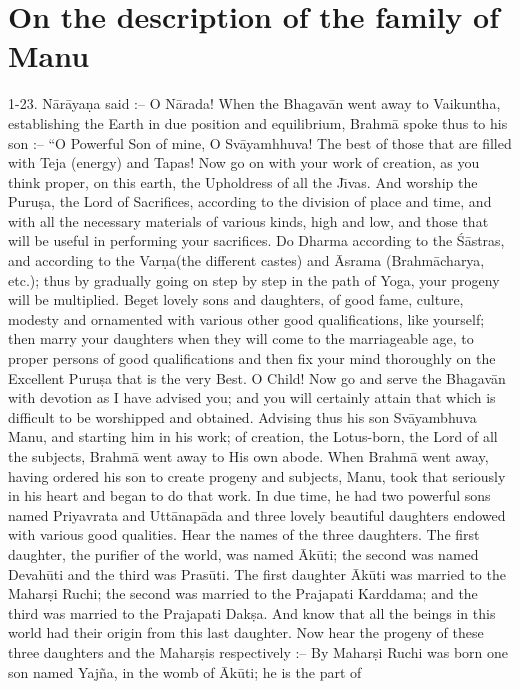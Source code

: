 \chapter{On the description of the family of Manu}

1-23. N\=ar\=aya\d{n}a said :-- O N\=arada! When the Bhagav\=an went away to Vaikuntha, establishing the Earth in due position and equilibrium, Brahm\=a spoke thus to his son :-- ``O Powerful Son of mine, O Sv\=ayamhhuva! The best of those that are filled with Teja (energy) and Tapas! Now go on with your work of creation, as you think proper, on this earth, the Upholdress of all the J\={\i}vas. And worship the Puru\d{s}a, the Lord of Sacrifices, according to the division of place and time, and with all the necessary materials of various kinds, high and low, and those that will be useful in performing your sacrifices. Do Dharma according to the \'S\=astras, and according to the Var\d{n}a(the different castes) and \=Asrama (Brahm\=acharya, etc.); thus by gradually going on step by step in the path of Yoga, your progeny will be multiplied. Beget lovely sons and daughters, of good fame, culture, modesty and ornamented with various other good qualifications, like yourself; then marry your daughters when they will come to the marriageable age, to proper persons of good qualifications and then fix your mind thoroughly on the Excellent Puru\d{s}a that is the very Best. O Child! Now go and serve the Bhagav\=an with devotion as I have advised you; and you will certainly attain that which is difficult to be worshipped and obtained. Advising thus his son Sv\=ayambhuva Manu, and starting him in his work; of creation, the Lotus-born, the Lord of all the subjects, Brahm\=a went away to His own abode. When Brahm\=a went away, having ordered his son to create progeny and subjects, Manu, took that seriously in his heart and began to do that work. In due time, he had two powerful sons named Priyavrata and Utt\=anap\=ada and three lovely beautiful daughters endowed with various good qualities. Hear the names of the three daughters. The first daughter, the purifier of the world, was named \=Ak\=uti; the second was named Devah\=uti and the third was Pras\=uti. The first daughter \=Ak\=uti was married to the Mahar\d{s}i Ruchi; the second was married to the Prajapati Karddama; and the third was married to the Prajapati Dak\d{s}a. And know that all the beings in this world had their origin from this last daughter. Now hear the progeny of these three daughters and the Mahar\d{s}is respectively :-- By Mahar\d{s}i Ruchi was born one son named Yaj\~na, in the womb of \=Ak\=uti; he is the part of

